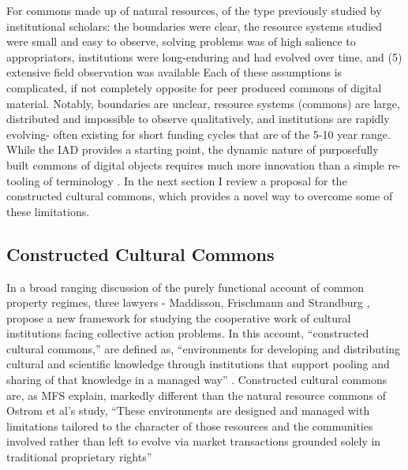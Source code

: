 For commons made up of natural resources, of the
type previously studied by institutional scholars: the boundaries were clear,  the resource systems studied were small and easy to observe, solving problems was of high salience to appropriators, institutions were long-enduring and had evolved over time, and (5)
extensive field observation was available \citep{ostrom2011background} Each of these
assumptions is complicated, if not completely opposite for peer produced
commons of digital material. Notably, boundaries are unclear, resource
systems (commons) are large, distributed and impossible to observe
qualitatively, and institutions are rapidly evolving- often existing for
short funding cycles that are of the 5-10 year range. While the IAD
provides a starting point, the dynamic nature of purposefully built
commons of digital objects requires much more innovation than a simple
re-tooling of terminology \citep{hess2007understanding}. In the next section I
review a proposal for the constructed cultural commons, which provides a
novel way to overcome some of these limitations.\\ 

\subsection*{Constructed Cultural Commons} 

In a broad ranging discussion of the purely functional
account of common property regimes, three lawyers - Maddisson,
Frischmann and Strandburg , propose a new framework for studying the
cooperative work of cultural institutions facing collective action
problems. In this account, ``constructed cultural commons,'' are defined
as, ``environments for developing and distributing cultural and
scientific knowledge through institutions that support pooling and
sharing of that knowledge in a managed way'' \citep[p. 659]{madison2010constructing}. Constructed cultural commons are, as MFS
explain, markedly different than the natural resource commons of Ostrom
et al's study, ``These environments are designed and managed with
limitations tailored to the character of those resources and the
communities involved rather than left to evolve via market transactions
grounded solely in traditional proprietary rights'' \citep[p. 659]{madison2010constructing}\\

